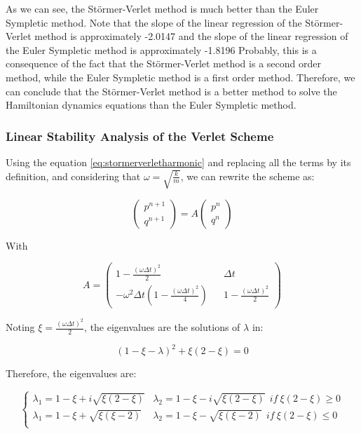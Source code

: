 \documentclass{report}
\begin{document}
As we can see, the Störmer-Verlet method is much better than the Euler Sympletic method. Note that the slope of the linear regression of the Störmer-Verlet method is approximately -2.0147 and the slope of the linear regression of the Euler Sympletic method is approximately -1.8196 Probably, this is a consequence of the fact that the Störmer-Verlet method is a second order method, while the Euler Sympletic method is a first order method. Therefore, we can conclude that the Störmer-Verlet method is a better method to solve the Hamiltonian dynamics equations than the Euler Sympletic method.

\subsubsection{Linear Stability Analysis of the Verlet Scheme}
\label{sec:linear_stability_verlet}

Using the equation \ref{eq:stormerverletharmonic} and replacing all the terms by its definition, and considering that \(\omega = \sqrt{\frac{k}{m}}\), we can rewrite the scheme as:

\[
	\begin{pmatrix} p^{n+1} \\ q^{n+1} \end{pmatrix} = A \begin{pmatrix} p^{n} \\ q^{n} \end{pmatrix}
\]

With

\[
	A = \begin{pmatrix}
		1 - \frac{(\omega \Delta t)^2}{2} && \Delta t \\
		-\omega^2 \Delta t (1 - \frac{(\omega \Delta t)^2}{4}) && 1 - \frac{(\omega \Delta t)^2}{2}
	\end{pmatrix}
\]

Noting \(\xi = \frac{(\omega \Delta t)^2}{2}\), the eigenvalues are the solutions of $\lambda$ in:

\[
	(1 - \xi - \lambda)^2 + \xi (2 - \xi) = 0
\]

Therefore, the eigenvalues are:

\[
	\begin{cases}
		\lambda_1 = 1 - \xi + i\sqrt{\xi(2-\xi)} &
		\lambda_2 = 1 - \xi - i\sqrt{\xi(2-\xi)} \ \ if \ \xi(2-\xi) \geq 0 \\

		\lambda_1 = 1 - \xi + \sqrt{\xi(\xi - 2)} &
		\lambda_2 = 1 - \xi - \sqrt{\xi(\xi - 2)} \ \ if \ \xi(2-\xi) \leq 0 \\
	\end{cases}
\]
\end{document}
